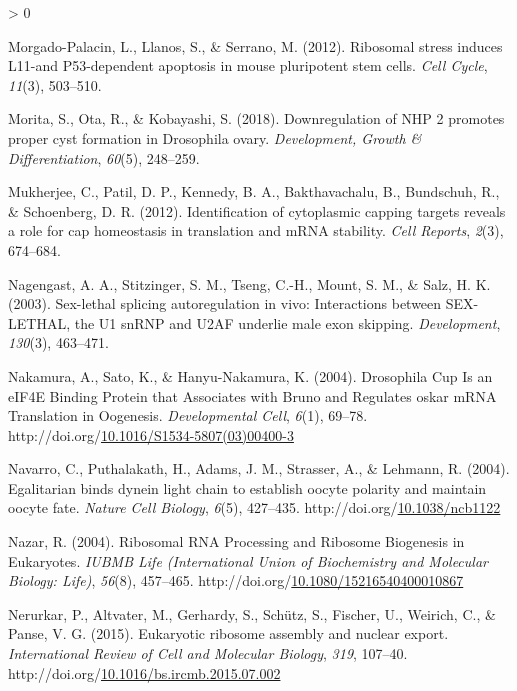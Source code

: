 \documentclass[12pt,oneside]{reedthesis}
\newlength{\cslhangindent}
\newenvironment{CSLReferences}[2] %
 {%
  \setlength{\parindent}{0pt}
  \ifodd #1 \everypar{\setlength{\hangindent}{\cslhangindent}}\ignorespaces\fi
  \ifnum #2 > 0
  \setlength{\parskip}{#2\baselineskip}
  \fi
 }%
 {}
\begin{document}
\begin{CSLReferences}{1}{0}
\leavevmode\hypertarget{ref-Morgado-Palacin2012a}{}%
Morgado-Palacin, L., Llanos, S., \& Serrano, M. (2012). Ribosomal stress induces {L11}-and P53-dependent apoptosis in mouse pluripotent stem cells. \emph{Cell Cycle}, \emph{11}(3), 503--510.

\leavevmode\hypertarget{ref-Morita2018}{}%
Morita, S., Ota, R., \& Kobayashi, S. (2018). Downregulation of {NHP} 2 promotes proper cyst formation in {Drosophila} ovary. \emph{Development, Growth \& Differentiation}, \emph{60}(5), 248--259.

\leavevmode\hypertarget{ref-Mukherjee2012}{}%
Mukherjee, C., Patil, D. P., Kennedy, B. A., Bakthavachalu, B., Bundschuh, R., \& Schoenberg, D. R. (2012). Identification of cytoplasmic capping targets reveals a role for cap homeostasis in translation and {mRNA} stability. \emph{Cell Reports}, \emph{2}(3), 674--684.

\leavevmode\hypertarget{ref-Nagengast2003}{}%
Nagengast, A. A., Stitzinger, S. M., Tseng, C.-H., Mount, S. M., \& Salz, H. K. (2003). Sex-lethal splicing autoregulation in vivo: Interactions between {SEX}-{LETHAL}, the {U1 snRNP} and {U2AF} underlie male exon skipping. \emph{Development}, \emph{130}(3), 463--471.

\leavevmode\hypertarget{ref-Nakamura2004g}{}%
Nakamura, A., Sato, K., \& Hanyu-Nakamura, K. (2004). Drosophila {Cup Is} an {eIF4E Binding Protein} that {Associates} with {Bruno} and {Regulates} oskar {mRNA Translation} in {Oogenesis}. \emph{Developmental Cell}, \emph{6}(1), 69--78. http://doi.org/\href{https://doi.org/10.1016/S1534-5807(03)00400-3}{10.1016/S1534-5807(03)00400-3}

\leavevmode\hypertarget{ref-Navarro2004b}{}%
Navarro, C., Puthalakath, H., Adams, J. M., Strasser, A., \& Lehmann, R. (2004). Egalitarian binds dynein light chain to establish oocyte polarity and maintain oocyte fate. \emph{Nature Cell Biology}, \emph{6}(5), 427--435. http://doi.org/\href{https://doi.org/10.1038/ncb1122}{10.1038/ncb1122}

\leavevmode\hypertarget{ref-Nazar2004a}{}%
Nazar, R. (2004). Ribosomal {RNA Processing} and {Ribosome Biogenesis} in {Eukaryotes}. \emph{IUBMB Life (International Union of Biochemistry and Molecular Biology: Life)}, \emph{56}(8), 457--465. http://doi.org/\href{https://doi.org/10.1080/15216540400010867}{10.1080/15216540400010867}

\leavevmode\hypertarget{ref-nerurkarEukaryoticRibosomeAssembly2015}{}%
Nerurkar, P., Altvater, M., Gerhardy, S., Schütz, S., Fischer, U., Weirich, C., \& Panse, V. G. (2015). Eukaryotic ribosome assembly and nuclear export. \emph{International Review of Cell and Molecular Biology}, \emph{319}, 107--40. http://doi.org/\href{https://doi.org/10.1016/bs.ircmb.2015.07.002}{10.1016/bs.ircmb.2015.07.002}


\end{CSLReferences}
\end{document}
